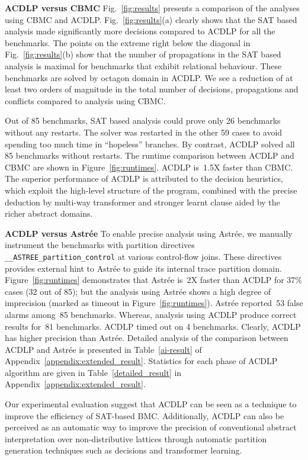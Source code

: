 

%
\noindent \textbf{ACDLP versus CBMC}
Fig.~\ref{fig:results} presents a comparison of the analyses using CBMC
and ACDLP.  Fig.~\ref{fig:results}(a) clearly shows that the SAT based analysis 
made significantly more decisions compared to ACDLP for all the benchmarks. 
The points on the extreme right below the diagonal in
Fig.~\ref{fig:results}(b) show that the number of propagations in the SAT based 
analysis is maximal for benchmarks that exhibit relational behaviour.  These
benchmarks are solved by octagon domain in ACDLP.  We see a reduction of at 
least two orders of magnitude in the total number of decisions, propagations 
and conflicts compared to analysis using CBMC.  

Out of 85 benchmarks, SAT based analysis could prove only 26
benchmarks without any restarts.  The solver was restarted in the other 59 
cases to avoid spending too much time in ``hopeless'' branches.  By contrast, 
ACDLP solved all 85 benchmarks without restarts.  
The runtime comparison between ACDLP and CBMC are shown in 
Figure~\ref{fig:runtimes}.  ACDLP is~1.5X faster than CBMC. 
The superior performance of ACDLP is attributed to the decision heuristics, 
which exploit the high-level structure of the program, combined with the 
precise deduction by multi-way transformer and stronger learnt clause aided 
by the richer abstract domains. 
%


\noindent \textbf{ACDLP versus Astr{\'e}e}
%
To enable precise analysis using Astr{\'e}e, we manually instrument 
the benchmarks with partition directives \texttt{\_\_ASTREE\_partition\_control} 
at various control-flow joins.  These directives provides external hint to
Astr{\'e}e to guide its internal trace partition domain. 
Figure~\ref{fig:runtimes} demonstrates that Astr{\'e}e is~2X faster 
than ACDLP for {37}\% cases (32 out of 85); but the analysis using 
Astr{\'e}e shows a high degree of imprecision (marked as timeout in 
Figure~\ref{fig:runtimes}).  Astr{\'e}e reported~53 false alarms 
among~85 benchmarks.  Whereas, analysis using ACDLP produce correct 
results for~81 benchmarks. ACDLP timed out on 4 benchmarks.  Clearly, 
ACDLP has higher precision than Astr{\'e}e. Detailed analysis 
of the comparison between ACDLP and 
Astr{\'e}e is presented in Table~\ref{ai-result} of 
Appendix~\ref{appendix:extended_result}.  Statistics for each phase of ACDLP 
algorithm are given in Table~\ref{detailed_result} in Appendix~\ref{appendix:extended_result}.  


Our experimental evaluation suggest that ACDLP can be seen as a
technique to improve the efficiency of SAT-based BMC.  Additionally, ACDLP can
also be perceived as an automatic way to improve the precision of conventional
abstract interpretation over non-distributive lattices through automatic partition 
generation techniques such as decisions and transformer learning.
